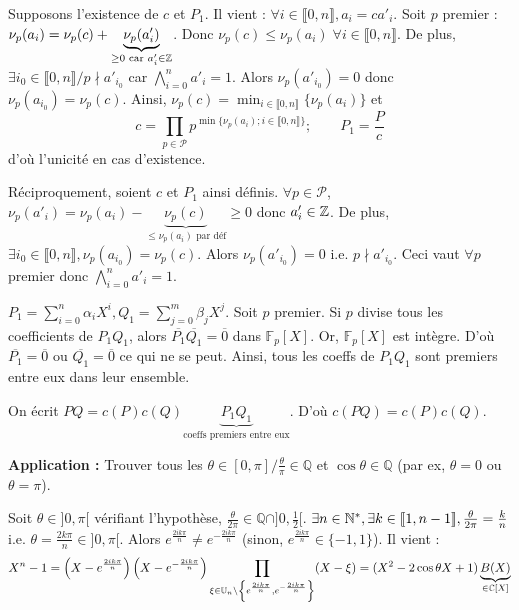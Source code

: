 \begin{solution}
Supposons l'existence de $c$ et $P_1$. Il vient : $\forall i \in \llbracket 0, n \rrbracket, a_i = c a'_i$.
Soit $p$ premier : $\nu_p(a_i) = \nu_p(c) + \underbrace{\nu_p(a'_i)}_{\geq 0 \text{ car } a'_i \in \mathbb Z}$.
Donc $\nu_p(c) \leq \nu_p(a_i) \; \forall i \in \llbracket 0, n \rrbracket$.
De plus, $\exists i_0 \in \llbracket 0, n \rrbracket / p \nmid a'_{i_0}$ car $\bigwedge_{i=0}^n a'_i = 1$. Alors $\nu_p(a'_{i_0}) = 0$ donc $\nu_p(a_{i_0}) = \nu_p(c)$.
Ainsi, $\nu_p(c) = \min_{i \in \llbracket 0, n \rrbracket} \{\nu_p(a_i)\}$ et
\[ c = \prod_{p \in \mathcal{P}} p^{\min \{\nu_p(a_i) ; i \in \llbracket 0, n \rrbracket\}} ; \qquad P_1 = \frac{P}{c} \]
d'où l'unicité en cas d'existence.

Réciproquement, soient $c$ et $P_1$ ainsi définis.
$\forall p \in \mathcal{P}$, $\nu_p(a'_i) = \nu_p(a_i) - \underbrace{\nu_p(c)}_{\leq \nu_p(a_i) \text{ par déf}} \geq 0$ donc $a'_i \in \mathbb Z$.
De plus, $\exists i_0 \in \llbracket 0, n \rrbracket, \nu_p(a_{i_0}) = \nu_p(c)$. Alors $\nu_p(a'_{i_0}) = 0$ i.e. $p \nmid a'_{i_0}$.
Ceci vaut $\forall p$ premier donc $\bigwedge_{i=0}^n a'_i = 1$.

$P_1 = \sum_{i=0}^n \alpha_i X^i, Q_1 = \sum_{j=0}^m \beta_j X^j$. Soit $p$ premier. Si $p$ divise tous les coefficients de $P_1 Q_1$, alors $\overline{P_1} \overline{Q_1} = \overline{0}$ dans $\mathbb{F}_p[X]$.
Or, $\mathbb{F}_p[X]$ est intègre. D'où $\overline{P_1} = \overline{0}$ ou $\overline{Q_1} = \overline{0}$ ce qui ne se peut.
Ainsi, tous les coeffs de $P_1 Q_1$ sont premiers entre eux dans leur ensemble.

On écrit $PQ = c(P) c(Q) \underbrace{P_1 Q_1}_{\text{coeffs premiers entre eux}}$.
D'où $\boxed{c(PQ) = c(P) c(Q)}$.

\medskip
\textbf{Application :} Trouver tous les $\theta \in [0, \pi] / \frac{\theta}{\pi} \in \mathbb{Q}$ et $\cos \theta \in \mathbb{Q}$ (par ex, $\theta = 0$ ou $\theta = \pi$).

Soit $\theta \in ]0, \pi[$ vérifiant l'hypothèse, $\frac{\theta}{2\pi} \in \mathbb{Q} \cap ]0, \frac{1}{2}[$.
$\exists n \in \mathbb N^*, \exists k \in \llbracket 1, n-1 \rrbracket, \frac{\theta}{2\pi} = \frac{k}{n}$ i.e. $\theta = \frac{2k\pi}{n} \in ]0, \pi[$.
Alors $e^{\frac{2ik\pi}{n}} \neq e^{-\frac{2ik\pi}{n}}$ (sinon, $e^{\frac{2ik\pi}{n}} \in \{-1, 1\}$).
Il vient :
\[ X^n - 1 = \left(X - e^{\frac{2ik\pi}{n}}\right)\left(X - e^{-\frac{2ik\pi}{n}}\right) \prod_{\xi \in \mathbb{U}_n \setminus \left\{e^{\frac{2ik\pi}{n}}, e^{-\frac{2ik\pi}{n}}\right\}} (X - \xi) = (X^2 - 2\cos\theta X + 1) \underbrace{B(X)}_{\in \mathbb C[X]} \]


\end{solution}
